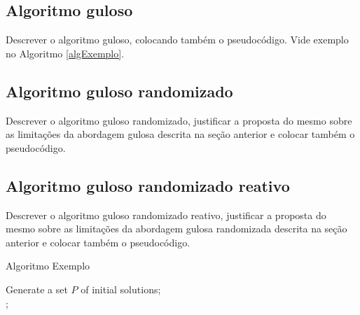 \documentclass[12pt,fleqn]{article}
\begin{document}
\subsection{Algoritmo guloso}
\label{subSecAlgGulo}

Descrever o algoritmo guloso, colocando também o pseudocódigo. Vide exemplo no Algoritmo \ref{algExemplo}.


\subsection{Algoritmo guloso randomizado}
\label{subSecAlgRand}

Descrever o algoritmo guloso randomizado, justificar a proposta do mesmo sobre as limitações da abordagem gulosa descrita na seção anterior e colocar também o pseudocódigo.


\subsection{Algoritmo guloso randomizado reativo}
\label{subSecAlgRandReact}
Descrever o algoritmo guloso randomizado reativo, justificar a proposta do mesmo sobre as limitações da abordagem gulosa randomizada descrita na seção anterior e colocar também o pseudocódigo.

\begin{algorithm}[!htb]
  \SetAlgoLined
  \caption{Algoritmo Exemplo}\label{alg.PPA}
  \label{algExemplo}
  Generate a set $P$ of initial solutions; \\
  
    ; \\
\end{algorithm}
\end{document}
